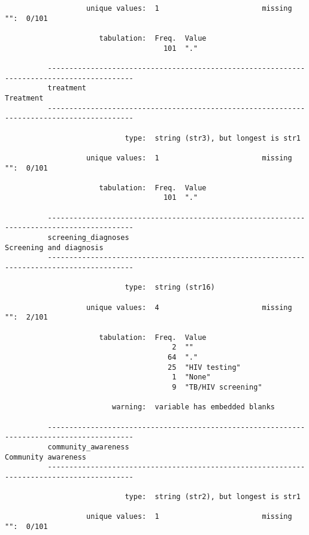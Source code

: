 \documentclass{article}
\begin{document}
\begin{verbatim}
                   unique values:  1                        missing "":  0/101
          
                      tabulation:  Freq.  Value
                                     101  "."
          
          ------------------------------------------------------------------------------------------
          treatment                                                                        Treatment
          ------------------------------------------------------------------------------------------
          
                            type:  string (str3), but longest is str1
          
                   unique values:  1                        missing "":  0/101
          
                      tabulation:  Freq.  Value
                                     101  "."
          
          ------------------------------------------------------------------------------------------
          screening_diagnoses                                                Screening and diagnosis
          ------------------------------------------------------------------------------------------
          
                            type:  string (str16)
          
                   unique values:  4                        missing "":  2/101
          
                      tabulation:  Freq.  Value
                                       2  ""
                                      64  "."
                                      25  "HIV testing"
                                       1  "None"
                                       9  "TB/HIV screening"
          
                         warning:  variable has embedded blanks
          
          ------------------------------------------------------------------------------------------
          community_awareness                                                    Community awareness
          ------------------------------------------------------------------------------------------
          
                            type:  string (str2), but longest is str1
          
                   unique values:  1                        missing "":  0/101
          

\end{verbatim}
\end{document}
